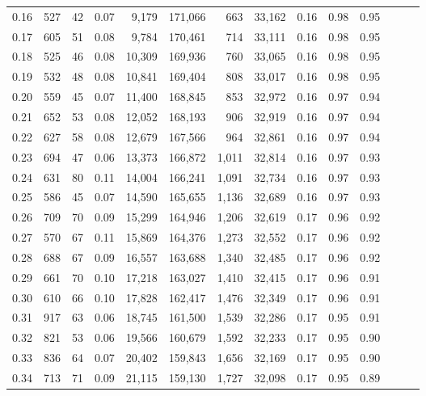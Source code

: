 \begin{tabular}{rrrrrrrrrrrrrr}
0.16 &    527 &     42 &  0.07 &    9,179 &  171,066 &     663 &  33,162 &  0.16 &  0.98 &      0.95 \\
0.17 &    605 &     51 &  0.08 &    9,784 &  170,461 &     714 &  33,111 &  0.16 &  0.98 &      0.95 \\
0.18 &    525 &     46 &  0.08 &   10,309 &  169,936 &     760 &  33,065 &  0.16 &  0.98 &      0.95 \\
0.19 &    532 &     48 &  0.08 &   10,841 &  169,404 &     808 &  33,017 &  0.16 &  0.98 &      0.95 \\
0.20 &    559 &     45 &  0.07 &   11,400 &  168,845 &     853 &  32,972 &  0.16 &  0.97 &      0.94 \\
0.21 &    652 &     53 &  0.08 &   12,052 &  168,193 &     906 &  32,919 &  0.16 &  0.97 &      0.94 \\
0.22 &    627 &     58 &  0.08 &   12,679 &  167,566 &     964 &  32,861 &  0.16 &  0.97 &      0.94 \\
0.23 &    694 &     47 &  0.06 &   13,373 &  166,872 &   1,011 &  32,814 &  0.16 &  0.97 &      0.93 \\
0.24 &    631 &     80 &  0.11 &   14,004 &  166,241 &   1,091 &  32,734 &  0.16 &  0.97 &      0.93 \\
0.25 &    586 &     45 &  0.07 &   14,590 &  165,655 &   1,136 &  32,689 &  0.16 &  0.97 &      0.93 \\
0.26 &    709 &     70 &  0.09 &   15,299 &  164,946 &   1,206 &  32,619 &  0.17 &  0.96 &      0.92 \\
0.27 &    570 &     67 &  0.11 &   15,869 &  164,376 &   1,273 &  32,552 &  0.17 &  0.96 &      0.92 \\
0.28 &    688 &     67 &  0.09 &   16,557 &  163,688 &   1,340 &  32,485 &  0.17 &  0.96 &      0.92 \\
0.29 &    661 &     70 &  0.10 &   17,218 &  163,027 &   1,410 &  32,415 &  0.17 &  0.96 &      0.91 \\
0.30 &    610 &     66 &  0.10 &   17,828 &  162,417 &   1,476 &  32,349 &  0.17 &  0.96 &      0.91 \\
0.31 &    917 &     63 &  0.06 &   18,745 &  161,500 &   1,539 &  32,286 &  0.17 &  0.95 &      0.91 \\
0.32 &    821 &     53 &  0.06 &   19,566 &  160,679 &   1,592 &  32,233 &  0.17 &  0.95 &      0.90 \\
0.33 &    836 &     64 &  0.07 &   20,402 &  159,843 &   1,656 &  32,169 &  0.17 &  0.95 &      0.90 \\
0.34 &    713 &     71 &  0.09 &   21,115 &  159,130 &   1,727 &  32,098 &  0.17 &  0.95 &      0.89 \\

\end{tabular}

